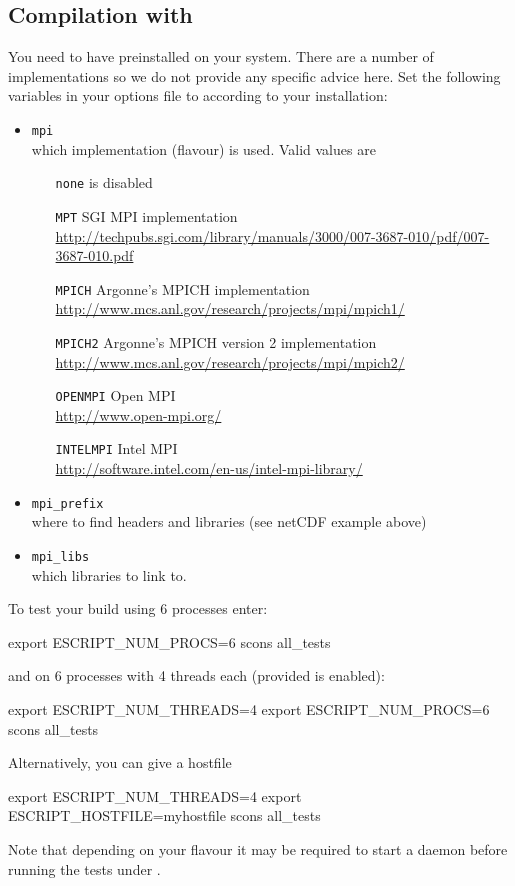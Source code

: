 \subsection{Compilation with \mpi}
You need to have \mpi preinstalled on your system.
There are a number of implementations so we do not provide any specific advice
here.
Set the following variables in your options file to according to your
installation:
\begin{itemize}
 \item \texttt{mpi} \\
    which \mpi implementation (flavour) is used. Valid values are
    \begin{itemize}
        \item[\texttt{none}] \mpi is disabled
        \item[\texttt{MPT}] SGI MPI implementation \\
            \url{http://techpubs.sgi.com/library/manuals/3000/007-3687-010/pdf/007-3687-010.pdf}
        \item[\texttt{MPICH}] Argonne's MPICH implementation \\
            \url{http://www.mcs.anl.gov/research/projects/mpi/mpich1/}
        \item[\texttt{MPICH2}] Argonne's MPICH version 2 implementation \\
            \url{http://www.mcs.anl.gov/research/projects/mpi/mpich2/}
        \item[\texttt{OPENMPI}] Open MPI \\
            \url{http://www.open-mpi.org/}
        \item[\texttt{INTELMPI}] Intel MPI \\
            \url{http://software.intel.com/en-us/intel-mpi-library/}
    \end{itemize}
 \item \texttt{mpi_prefix} \\
    where to find \mpi headers and libraries (see netCDF example above)
 \item \texttt{mpi_libs} \\
    which libraries to link to.
\end{itemize}

To test your build using 6 processes enter:
\begin{shellCode}
export ESCRIPT_NUM_PROCS=6
scons all_tests
\end{shellCode}
and on 6 processes with 4 threads each (provided \openmp is enabled):
\begin{shellCode}
export ESCRIPT_NUM_THREADS=4
export ESCRIPT_NUM_PROCS=6
scons all_tests
\end{shellCode}
Alternatively, you can give a hostfile
\begin{shellCode}
export ESCRIPT_NUM_THREADS=4
export ESCRIPT_HOSTFILE=myhostfile
scons all_tests
\end{shellCode}
Note that depending on your \mpi flavour it may be required to start a daemon
before running the tests under \mpi.

